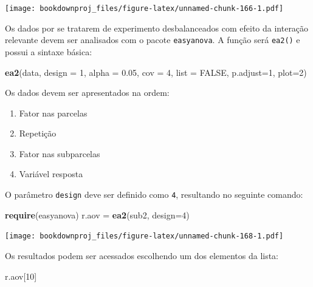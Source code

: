 \documentclass[
]{article}
\newenvironment{Shaded}{\begin{snugshade}}{\end{snugshade}}
\newcommand{\DataTypeTok}[1]{\textcolor[rgb]{0.13,0.29,0.53}{#1}}
\newcommand{\DecValTok}[1]{\textcolor[rgb]{0.00,0.00,0.81}{#1}}
\newcommand{\FloatTok}[1]{\textcolor[rgb]{0.00,0.00,0.81}{#1}}
\newcommand{\KeywordTok}[1]{\textcolor[rgb]{0.13,0.29,0.53}{\textbf{#1}}}
\newcommand{\NormalTok}[1]{#1}
\newcommand{\OtherTok}[1]{\textcolor[rgb]{0.56,0.35,0.01}{#1}}
\newcommand{\StringTok}[1]{\textcolor[rgb]{0.31,0.60,0.02}{#1}}
\providecommand{\tightlist}{%
  \setlength{\itemsep}{0pt}\setlength{\parskip}{0pt}}
\begin{document}
\texttt{[image: bookdownproj\_files/figure-latex/unnamed-chunk-166-1.pdf]}

Os dados por se tratarem de experimento desbalanceados com efeito da interação relevante devem ser analisados com o pacote \texttt{easyanova}. A função será \texttt{ea2()} e possui a sintaxe básica:

\begin{Shaded}
\begin{Highlighting}[]
\KeywordTok{ea2}\NormalTok{(data, }\DataTypeTok{design =} \DecValTok{1}\NormalTok{, }\DataTypeTok{alpha =} \FloatTok{0.05}\NormalTok{, }\DataTypeTok{cov =} \DecValTok{4}\NormalTok{, }\DataTypeTok{list =} \OtherTok{FALSE}\NormalTok{, }
    \DataTypeTok{p.adjust=}\DecValTok{1}\NormalTok{, }\DataTypeTok{plot=}\DecValTok{2}\NormalTok{)}
\end{Highlighting}
\end{Shaded}

Os dados devem ser apresentados na ordem:

\begin{enumerate}
\def\labelenumi{\arabic{enumi}.}
\tightlist
\item
  Fator nas parcelas
\item
  Repetição
\item
  Fator nas subparcelas
\item
  Variável resposta
\end{enumerate}

O parâmetro \texttt{design} deve ser definido como \texttt{4}, resultando no seguinte comando:

\begin{Shaded}
\begin{Highlighting}[]
\KeywordTok{require}\NormalTok{(easyanova)}
\NormalTok{r.aov =}\StringTok{ }\KeywordTok{ea2}\NormalTok{(sub2, }\DataTypeTok{design=}\DecValTok{4}\NormalTok{)}
\end{Highlighting}
\end{Shaded}

\texttt{[image: bookdownproj\_files/figure-latex/unnamed-chunk-168-1.pdf]}

Os resultados podem ser acessados escolhendo um dos elementos da lista:

\begin{Shaded}
\begin{Highlighting}[]
\NormalTok{r.aov[}\DecValTok{10}\NormalTok{]}
\end{Highlighting}
\end{Shaded}
\end{document}
